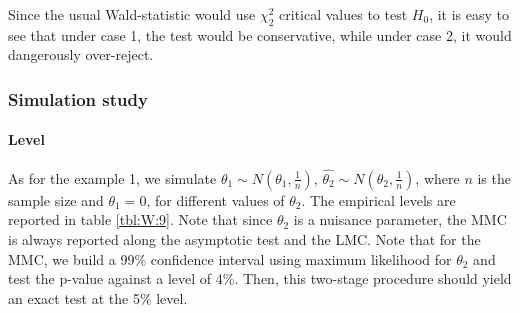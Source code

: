 \documentclass[]{article}\usepackage[]{graphicx}\usepackage[]{color}
\begin{document}
Since the usual Wald-statistic would use $\chi^2_2$ critical values to test $H_0$, it is easy to see that under case 1, the test would be conservative, while under case 2, it would dangerously over-reject.


\subsubsection{Simulation study}
\paragraph{Level}

As for the example 1, we simulate $\hat{\theta_1} \sim N(\theta_1,\frac{1}{n})$, $\hat{\theta_2} \sim N(\theta_2,\frac{1}{n})$, where $n$ is the sample size and $\theta_1=0$, for different values of $\theta_2$. The empirical levels are reported in table \ref{tbl:W:9}. Note that since $\theta_2$ is a nuisance parameter, the MMC is always reported along the asymptotic test and the LMC. Note that for the MMC, we build a 99\% confidence interval using maximum likelihood for $\theta_2$ and test the p-value against a level of 4\%. Then, this two-stage procedure should yield an exact test at the 5\% level.

\begin{table}[H]
	\centering
	\caption{Empirical levels for 1000 replications of the Wald statistic where $\alpha = 5\%$, $\theta_1=0$, testing $H_0: \left[ \theta_1\theta_2^2, \theta_1^2\right] =0$ against $H_1: \left[ \theta_1\theta_2^2, \theta_1^2\right] \neq 0$}
	\label{tbl:W:9}
\end{table}
\end{document}
